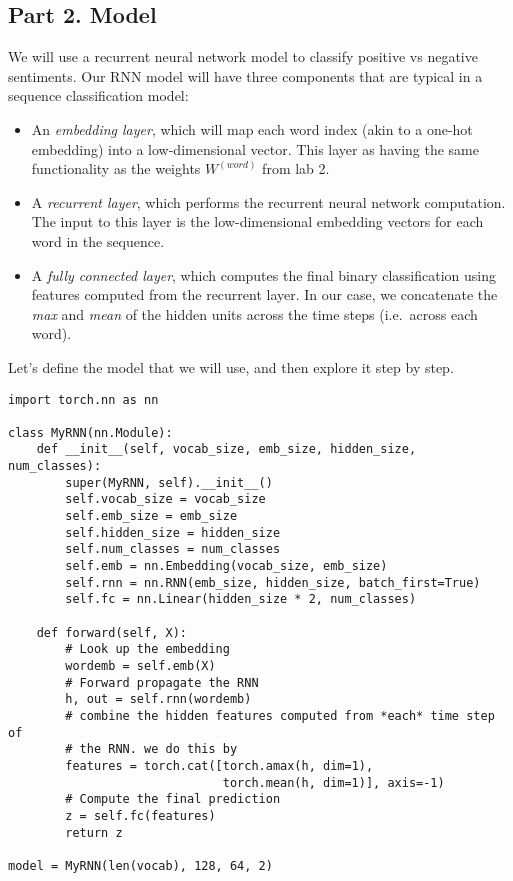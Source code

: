 \documentclass[
  letterpaper,
  DIV=11,
  numbers=noendperiod]{scrartcl}
\providecommand{\tightlist}{%
  \setlength{\itemsep}{0pt}\setlength{\parskip}{0pt}}
\begin{document}
\subsection{Part 2. Model}\label{part-2.-model}

We will use a recurrent neural network model to classify positive vs
negative sentiments. Our RNN model will have three components that are
typical in a sequence classification model:

\begin{itemize}
\tightlist
\item
  An \emph{embedding layer}, which will map each word index (akin to a
  one-hot embedding) into a low-dimensional vector. This layer as having
  the same functionality as the weights \(W^{(word)}\) from lab 2.
\item
  A \emph{recurrent layer}, which performs the recurrent neural network
  computation. The input to this layer is the low-dimensional embedding
  vectors for each word in the sequence.
\item
  A \emph{fully connected layer}, which computes the final binary
  classification using features computed from the recurrent layer. In
  our case, we concatenate the \emph{max} and \emph{mean} of the hidden
  units across the time steps (i.e.~across each word).
\end{itemize}

Let's define the model that we will use, and then explore it step by
step.

\begin{verbatim}
import torch.nn as nn

class MyRNN(nn.Module):
    def __init__(self, vocab_size, emb_size, hidden_size, num_classes):
        super(MyRNN, self).__init__()
        self.vocab_size = vocab_size
        self.emb_size = emb_size
        self.hidden_size = hidden_size
        self.num_classes = num_classes
        self.emb = nn.Embedding(vocab_size, emb_size)
        self.rnn = nn.RNN(emb_size, hidden_size, batch_first=True)
        self.fc = nn.Linear(hidden_size * 2, num_classes)

    def forward(self, X):
        # Look up the embedding
        wordemb = self.emb(X)
        # Forward propagate the RNN
        h, out = self.rnn(wordemb)
        # combine the hidden features computed from *each* time step of
        # the RNN. we do this by 
        features = torch.cat([torch.amax(h, dim=1),
                              torch.mean(h, dim=1)], axis=-1)
        # Compute the final prediction
        z = self.fc(features)
        return z

model = MyRNN(len(vocab), 128, 64, 2)
\end{verbatim}
\end{document}
